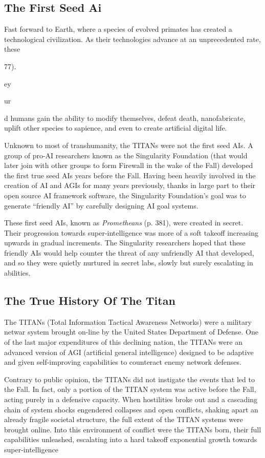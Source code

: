 \subsection{The First Seed Ai}

Fast forward to Earth, where a species of evolved primates
has created a technological civilization. As their
technologies advance at an unprecedented rate, these 

77). 

ey 

ur 

d
humans gain the ability to modify themselves, defeat 
death, nanofabricate, uplift other species to sapience, 
and even to create artificial digital life. 

Unknown to most of transhumanity, the TITANs 
were not the first seed AIs. A group of pro-AI researchers
known as the Singularity Foundation (that
would later join with other groups to form Firewall in 
the wake of the Fall) developed the first true seed AIs 
years before the Fall. Having been heavily involved in 
the creation of AI and AGIs for many years previously, 
thanks in large part to their open source AI framework
software, the Singularity Foundation's goal was
to generate ``friendly AI'' by carefully designing AI 
goal systems.

These first seed AIs, known as \textit{Prometheans }
(p. 381), were created in secret. Their progression 
towards super-intelligence was more of a soft takeoff
increasing upwards in gradual increments. The
Singularity researchers hoped that these friendly AIs 
would help counter the threat of any unfriendly AI 
that developed, and so they were quietly nurtured in 
secret labs, slowly but surely escalating in abilities. 

\subsection{The True History Of The Titan}

The TITANs (Total Information Tactical Awareness 
Networks) were a military netwar system brought 
on-line by the United States Department of Defense. 
One of the last major expenditures of this declining 
nation, the TITANs were an advanced version of AGI 
(artificial general intelligence) designed to be adaptive 
and given self-improving capabilities to counteract 
enemy network defenses. 

Contrary to public opinion, the TITANs did not 
instigate the events that led to the Fall. In fact, only 
a portion of the TITAN system was active before 
the Fall, acting purely in a defensive capacity. When 
hostilities broke out and a cascading chain of system 
shocks engendered collapses and open conflicts, shaking
apart an already fragile societal structure, the full
extent of the TITAN systems were brought online. 
Into this environment of conflict were the TITANs 
born, their full capabilities unleashed, escalating into 
a hard takeoff exponential growth towards super-intelligence


